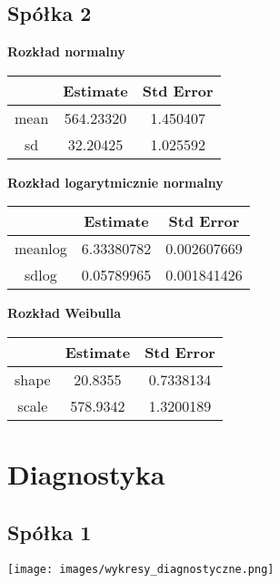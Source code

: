 \documentclass[a4paper,11pt]{article}
\begin{document}
\subsection{Spółka 2}
\begin{center}
{\textbf{Rozkład normalny}}\\
\begin{tabular}{ |c | c | c|  } 
  \hline
    & Estimate & Std Error  \\ 
  \hline
  mean & 564.23320   &  1.450407\\ 
  \hline
   sd &  32.20425    & 1.025592 \\ 
  \hline
\end{tabular}

{\textbf{Rozkład logarytmicznie normalny}}\\

\begin{tabular}{ |c | c | c|  } 
  \hline
    & Estimate & Std Error  \\ 
  \hline
  meanlog & 6.33380782  &  0.002607669\\ 
  \hline
   sdlog &  0.05789965    &  0.001841426 \\ 
  \hline
\end{tabular}
\end{center}

\begin{center} 
{\textbf{Rozkład Weibulla}}\\
\begin{tabular}{ |c | c | c|  } 
  \hline
    & Estimate & Std Error  \\ 
  \hline
  shape & 20.8355 &  0.7338134\\ 
  \hline
   scale &  578.9342    &  1.3200189 \\ 
  \hline
\end{tabular}
\end{center}


\section{Diagnostyka}
\subsection{Spółka 1}



\begin{center}
\texttt{[image: images/wykresy\_diagnostyczne.png]}
\end{center}
\end{document}
